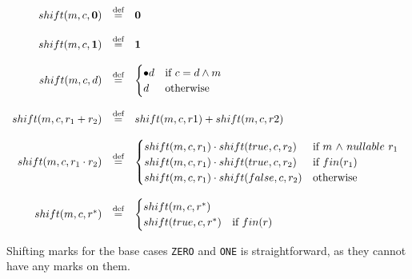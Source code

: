 \documentclass[12pt]{article}
\begin{document}
  \[
\begin{array}{rcl}
  shift(m,c,\textbf{0})              & \stackrel{\text{def}}{=} & \textbf{0} \\\\
  shift(m,c,\textbf{1})              & \stackrel{\text{def}}{=} & \textbf{1} \\\\
  shift(m,c,d)              & \stackrel{\text{def}}{=} &
   \begin{cases}
    \bullet d & \text{if  \( c=d \land m \)}\\
    d         & \text{otherwise}\\
   \end{cases} \\\\

  shift(m,c, r_1 + r_2)     & \stackrel{\text{def}}{=} & shift(m,c,r1) + shift(m,c,r2) \\\\
  shift(m,c, r_1 \cdot r_2) & \stackrel{\text{def}}{=} &
    \begin{cases}
      shift(m,c,r_1) \cdot shift(true,c,r_2)  & \text{if $m$ $\land$ $nullable$  $r_1$ } \\
      shift(m,c,r_1) \cdot shift(true,c,r_2)  & \text{if $fin(r_1)$} \\
      shift(m,c,r_1) \cdot shift(false,c,r_2) & \text{otherwise}
    \end{cases} \\\\
  shift(m,c, r^*)           & \stackrel{\text{def}}{=} &
    \begin{cases}
      shift(m,c,r^*)    &  \\
      shift(true,c,r^*) & \text{if $fin(r)$} \\
    \end{cases}
\end{array}
\]

\noindent
Shifting marks for the base cases \texttt{ZERO} and \texttt{ONE} is straightforward, as they cannot have any marks on them.
\end{document}

